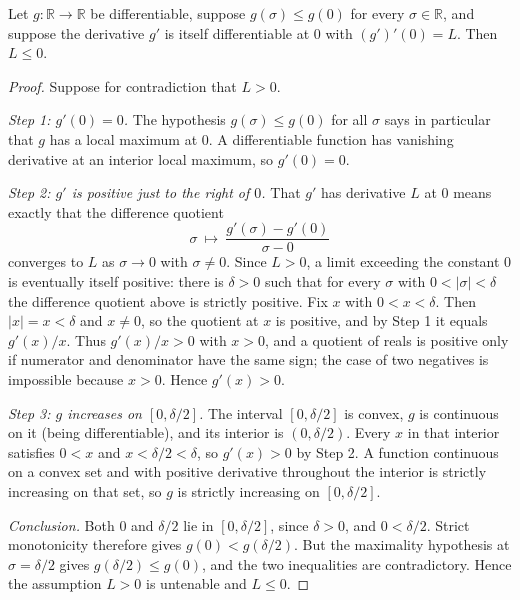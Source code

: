 \begin{lemma}
Let $g\colon\mathbb{R}\to\mathbb{R}$ be differentiable, suppose
$g(\sigma)\le g(0)$ for every $\sigma\in\mathbb{R}$, and suppose the derivative
$g'$ is itself differentiable at $0$ with $(g')'(0)=L$. Then $L\le 0$.
\end{lemma}
\begin{proof}
Suppose for contradiction that $L>0$.

\emph{Step 1: $g'(0)=0$.} The hypothesis $g(\sigma)\le g(0)$ for all $\sigma$
says in particular that $g$ has a local maximum at $0$. A differentiable
function has vanishing derivative at an interior local maximum, so $g'(0)=0$.

\emph{Step 2: $g'$ is positive just to the right of $0$.} That $g'$ has
derivative $L$ at $0$ means exactly that the difference quotient
\[
  \sigma\ \longmapsto\ \frac{g'(\sigma)-g'(0)}{\sigma-0}
\]
converges to $L$ as $\sigma\to 0$ with $\sigma\ne 0$. Since $L>0$, a limit
exceeding the constant $0$ is eventually itself positive: there is $\delta>0$
such that for every $\sigma$ with $0<\lvert \sigma\rvert<\delta$ the difference
quotient above is strictly positive. Fix $x$ with $0<x<\delta$. Then
$\lvert x\rvert=x<\delta$ and $x\ne 0$, so the quotient at $x$ is positive, and by
Step 1 it equals $g'(x)/x$. Thus $g'(x)/x>0$ with $x>0$, and a quotient of reals
is positive only if numerator and denominator have the same sign; the case of
two negatives is impossible because $x>0$. Hence $g'(x)>0$.

\emph{Step 3: $g$ increases on $[0,\delta/2]$.} The interval
$[0,\delta/2]$ is convex, $g$ is continuous on it (being differentiable), and
its interior is $(0,\delta/2)$. Every $x$ in that interior satisfies $0<x$ and
$x<\delta/2<\delta$, so $g'(x)>0$ by Step 2. A function continuous on a convex
set and with positive derivative throughout the interior is strictly increasing
on that set, so $g$ is strictly increasing on $[0,\delta/2]$.

\emph{Conclusion.} Both $0$ and $\delta/2$ lie in $[0,\delta/2]$, since
$\delta>0$, and $0<\delta/2$. Strict monotonicity therefore gives
$g(0)<g(\delta/2)$. But the maximality hypothesis at $\sigma=\delta/2$ gives
$g(\delta/2)\le g(0)$, and the two inequalities are contradictory. Hence the
assumption $L>0$ is untenable and $L\le 0$.
\end{proof}
